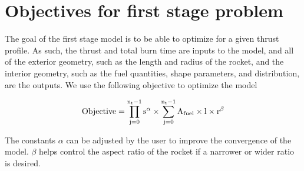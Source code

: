 \section{Objectives for first stage problem}

The goal of the first stage model is to be able to optimize for a given thrust profile.
As such, the thrust and total burn time are inputs to the model, and all of the
exterior geometry, such as the length and radius of the rocket, and the interior
geometry, such as the fuel quantities, shape parameters, and distribution, are the
outputs. We use the following objective to optimize the model

\begin{equation}
    \rm{Objective} =\prod\limits_{j=0}^{n_t-1} s^{\alpha} \times \sum\limits_{j=0}^{n_t-1} A_{\rm{fuel}}
    \times l \times r^{\beta}
\end{equation}

The constants $\alpha$ can be adjusted by the user to improve the
convergence of the model. $\beta$ helps control the aspect ratio of the
rocket if a narrower or wider ratio is desired.
